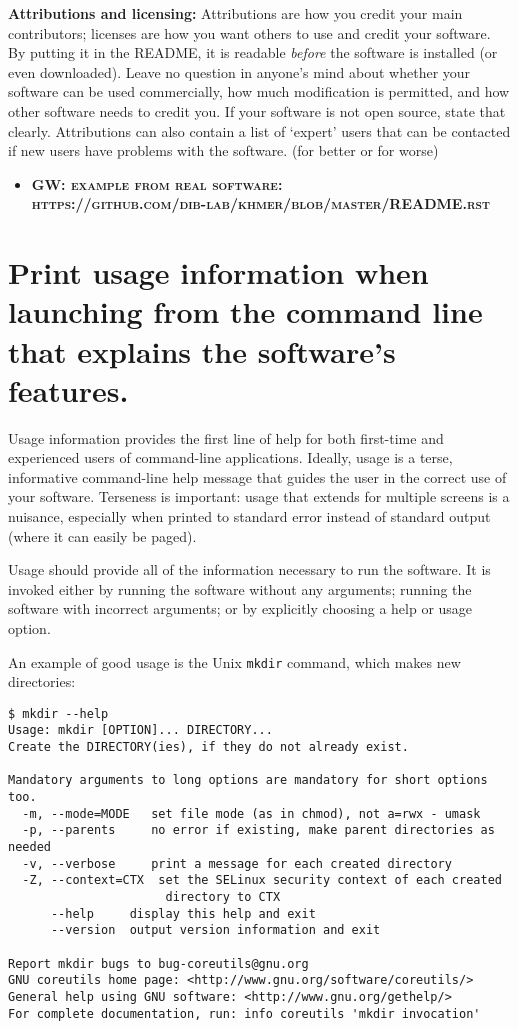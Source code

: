 \documentclass[10pt]{article}
\newcommand{\fixme}[2]{\textsc{\textbf{{#1}: {#2}}}}
\begin{document}
\textbf{Attributions and licensing:} Attributions are how you credit
your main contributors; licenses are how you want others to use and
credit your software. By putting it in the README, it is readable \emph{before}
the software is installed (or even downloaded).
Leave no
question in anyone's mind about whether your software can be used
commercially, how much modification is permitted, and how other software
needs to credit you. If your software is not open source, state that clearly.
Attributions can also contain a list of `expert' users
that can be contacted if new users have problems with the software. (for
better or for worse)

\begin{itemize}
\item
  \fixme{GW}{example from real software:\\ https://github.com/dib-lab/khmer/blob/master/README.rst}
\end{itemize}

\section{Print usage information when launching from the command line that explains the software's features.}

Usage information provides the first line of help for both first-time and
experienced users of command-line applications.
Ideally, usage is a terse, informative command-line help message that
guides the user in the correct use of your software. Terseness is
important: usage that extends for multiple screens is a nuisance, especially when
printed to standard error instead of standard output (where it can
easily be paged).

Usage should provide all of the information necessary to run the
software. It is invoked either by running the software without
any arguments; running the software with incorrect arguments; or by
explicitly choosing a help or usage option.

An example of good usage is the Unix \texttt{mkdir} command, which makes
new directories:

\begin{small}
\begin{verbatim}
$ mkdir --help
Usage: mkdir [OPTION]... DIRECTORY...
Create the DIRECTORY(ies), if they do not already exist.

Mandatory arguments to long options are mandatory for short options too.
  -m, --mode=MODE   set file mode (as in chmod), not a=rwx - umask
  -p, --parents     no error if existing, make parent directories as needed
  -v, --verbose     print a message for each created directory
  -Z, --context=CTX  set the SELinux security context of each created
                      directory to CTX
      --help     display this help and exit
      --version  output version information and exit

Report mkdir bugs to bug-coreutils@gnu.org
GNU coreutils home page: <http://www.gnu.org/software/coreutils/>
General help using GNU software: <http://www.gnu.org/gethelp/>
For complete documentation, run: info coreutils 'mkdir invocation'
\end{verbatim}
\end{small}
\end{document}
